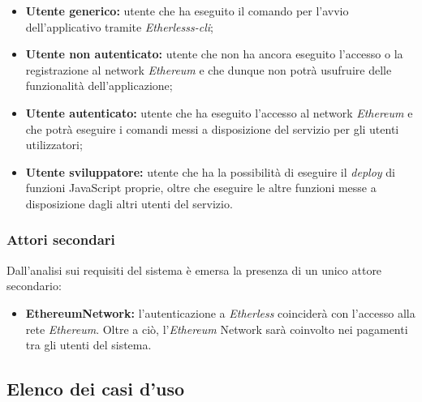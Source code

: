 \begin{itemize}
	\item \textbf{Utente generico:} utente che ha eseguito il comando per l'avvio dell'applicativo tramite \textit{Etherlesss-cli};
	\item \textbf{Utente non autenticato:} utente che non ha ancora eseguito l'accesso o la registrazione al network \textit{Ethereum\glo} e che dunque non potrà usufruire delle funzionalità dell'applicazione;
	\item \textbf{Utente autenticato:} utente che ha eseguito l'accesso al network \textit{Ethereum\glo} e che potrà eseguire i comandi messi a disposizione del servizio per gli utenti utilizzatori;
	\item \textbf{Utente sviluppatore:} utente che ha la possibilità di eseguire il \textit{deploy\glo} di funzioni JavaScript proprie, oltre che eseguire le altre funzioni messe a disposizione dagli altri utenti del servizio.
\end{itemize}


\subsubsection{Attori secondari}
Dall'analisi sui requisiti del sistema è emersa la presenza di un unico attore secondario:
\begin{itemize}
	\item \textbf{Ethereum\glo Network:} l'autenticazione a \textit{Etherless} coinciderà con l'accesso alla rete \textit{Ethereum\glos}. Oltre a ciò, l'\textit{Ethereum\glo} Network sarà coinvolto nei pagamenti tra gli utenti del sistema.
\end{itemize}


\subsection{Elenco dei casi d'uso}

